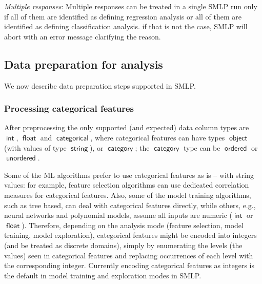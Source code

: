 \documentclass[a4paper,parskip=half]{article} %
\newcommand*\dtype[1]{\operatorname{\mathsf{#1}}} %
\newcommand{\delete}[1]{}
\begin{document}
\noindent \emph{Multiple responses}: 
Multiple responses can be treated in a single SMLP run only if all of them are identified as 
defining regression analysis or all of them are identified as defining classification analysis.
if that is not the case, SMLP will abort with an error message clarifying the reason.
        

\delete{
\subsection{Optimization problems}

If we are dealing with an optimization problem for a response or multiple responses, then combination
$positive\_value = STAT\_POSITIVE\_VALUE$ and $negative\_value = STAT\_NEGATIVE\_VALUE$ specifies that 
we want to maximize the response values (find regions in input space where the responses are
close to maximum / close to pareto optimal with respect to maximization; and conversely, combination
$positive\_value = STAT\_NEGATIVE\_VALUE$ and $negative\_value = STAT\_POSITIVE\_VALUE$ 
specifies that we are looking at (pareto) optimization problem with respect to minimization.
}




\subsection{Data preparation for analysis}\label{sec:data}

We now describe data preparation steps supported in SMLP. 


\subsubsection{Processing categorical features}

After preprocessing the only supported (and expected) data column types are $\dtype{int}$,  
$\dtype{float}$ and $\dtype{categorical}$, where categorical features can have types  $\dtype{object}$
(with values of type $\dtype{string}$), or $\dtype{category}$; the  $\dtype{category}$ type can be 
 $\dtype{ordered}$ or  $\dtype{unordered}$.

Some of the ML algorithms prefer to use categorical features as is -- with string values: for example,
feature selection algorithms can use dedicated correlation measures for categorical features. Also,
some of the model training algorithms, such as tree based, can deal with categorical features directly, 
while others, e.g., neural networks and polynomial models, assume all inputs are numeric
($\dtype{int}$ or $\dtype{float}$). Therefore, depending on the analysis mode (feature selection, model training,
model exploration), categorical features might be encoded into integers (and be treated as discrete 
domains), simply by enumerating the levels (the values) seen in categorical
features and replacing occurrences of each level with the corresponding integer. Currently 
encoding categorical features as integers is the default in model training and exploration modes in SMLP.
\end{document}
